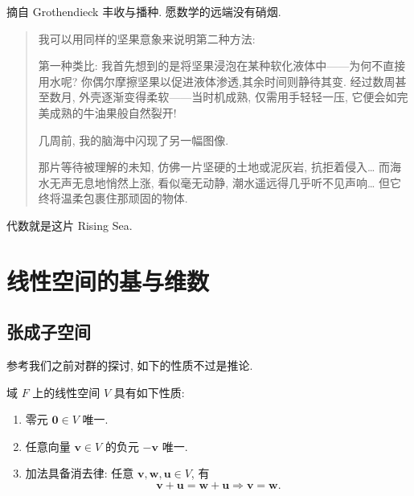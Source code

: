 \documentclass[UTF8]{book}
\begin{document}
\vspace*{5em}

摘自 Grothendieck 丰收与播种. 愿数学的远端没有硝烟. 

\begin{quotation}
    
    \kaishu   
    我可以用同样的坚果意象来说明第二种方法: 
    
    第一种类比: 
    我首先想到的是将坚果浸泡在某种软化液体中——为何不直接用水呢? 
    你偶尔摩擦坚果以促进液体渗透,其余时间则静待其变. 
    经过数周甚至数月, 外壳逐渐变得柔软——当时机成熟, 仅需用手轻轻一压, 
    它便会如完美成熟的牛油果般自然裂开! 

    几周前, 我的脑海中闪现了另一幅图像. 
      
    那片等待被理解的未知, 仿佛一片坚硬的土地或泥灰岩, 抗拒着侵入\dots
    而海水无声无息地悄然上涨, 看似毫无动静, 潮水遥远得几乎听不见声响\dots 
    但它终将温柔包裹住那顽固的物体. 
    
\end{quotation}

代数就是这片 Rising Sea. 

\setcounter{chapter}{5}
\chapter{线性空间的基与维数}
\section{张成子空间}
参考我们之前对群的探讨, 如下的性质不过是推论. 

\begin{proposition}
    域 $F$ 上的线性空间 $V$ 具有如下性质: 
    \begin{enumerate}[(1)]
        \item 零元 $\boldsymbol{0} \in V$ 唯一. 
        \item 任意向量 $\boldsymbol{v}\in V$ 的负元 $-\boldsymbol{v}$ 
        唯一. 
        \item 加法具备消去律: 任意 $\boldsymbol{v},\boldsymbol{w},
        \boldsymbol{u} \in V$, 有 
        $$\boldsymbol{v} +\boldsymbol{u} = \boldsymbol{w}+\boldsymbol{u} 
        \Longrightarrow \boldsymbol{v} = \boldsymbol{w}.$$
    \end{enumerate}
\end{proposition}
\end{document}
